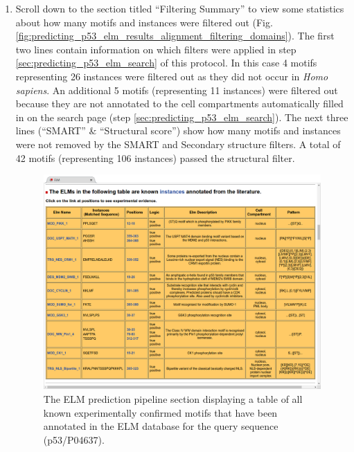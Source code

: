 \documentclass[12pt]{article}
\newcounter{proto}
\begin{document}
\begin{enumerate}
\item Scroll down to the section titled ``Filtering Summary'' to view some
	statistics about how many motifs and instances were filtered out
	(Fig.
	\ref{fig:predicting_p53_elm_results_alignment_filtering_domains}).
	The first two lines contain information on
	which filters were applied in step \ref{sec:predicting_p53_elm_search} of this protocol.
	In this case 4 motifs representing 26 instances were filtered
	out as they did not occur in \textit{Homo sapiens}. An additional 5
	motifs (representing 11 instances) were filtered out because they are
	not annotated to the cell compartments automatically filled in on the
	search page (step \ref{sec:predicting_p53_elm_search}).
	The next three lines (``SMART'' \& ``Structural score'') show how many
	motifs and instances were not removed by the SMART and Secondary
	structure filters. A total of 42 motifs (representing 106 instances)
	passed the structural filter.


\begin{figure}[h!]
	\centering
	\includegraphics[width=\textwidth]{Figures/25_elm_results_known.png}
	\caption{
		The ELM prediction pipeline section displaying a table
		of all known experimentally confirmed motifs
		that have been annotated in the ELM database for the query
		sequence (p53/P04637).
	}
	\label{fig:predicting_p53_elm_results_known}
\end{figure}


\end{enumerate}
\end{document}
